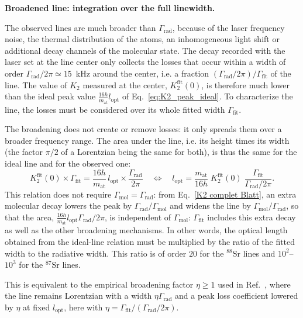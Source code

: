 \textbf{Broadened line: integration over the full linewidth.}

The observed lines are much broader than $\Gamma_{\text{rad}}$, because of the laser
frequency noise, the thermal distribution of the atoms, an inhomogeneous light shift
or additional decay channels of the molecular state. The
decay recorded with the laser set at the line center only collects the losses that
occur within a width of order $\Gamma_{\text{rad}}/2\pi\simeq15$~kHz around the
center, i.e. a fraction $(\Gamma_{\text{rad}}/2\pi)/\Gamma_{\text{fit}}$ of the line.
The value of $K_2$ measured at the center, $K_2^{\text{fit}}(0)$, is therefore much
lower than the ideal peak value $\frac{16h}{m_{\text{at}}}l_{\text{opt}}$ of
Eq.~\ref{eq:K2_peak_ideal}. To characterize the line, the losses must be considered
over its whole fitted width $\Gamma_{\text{fit}}$.

The broadening does not create or remove losses: it only spreads them over a broader
frequency range. The area under the line, i.e. its height times its width (the factor
$\pi/2$ of a Lorentzian being the same for both), is thus the same for the ideal line
and for the observed one:
\begin{equation}
    K_2^{\text{fit}}(0)\times\Gamma_{\text{fit}}
    = \frac{16h}{m_{\text{at}}}\,l_{\text{opt}}\times\frac{\Gamma_{\text{rad}}}{2\pi}
    \quad\Longleftrightarrow\quad
    l_{\text{opt}} = \frac{m_{\text{at}}}{16h}\;K_2^{\text{fit}}(0)\;
    \frac{\Gamma_{\text{fit}}}{\Gamma_{\text{rad}}/2\pi}.
    \label{eq:lopt_corrected}
\end{equation}
This relation does not require $\Gamma_{\text{mol}}=\Gamma_{\text{rad}}$: from Eq.~\ref{K2 complet Blatt}, an extra
molecular decay lowers the peak by $\Gamma_{\text{rad}}/\Gamma_{\text{mol}}$ and widens the line by
$\Gamma_{\text{mol}}/\Gamma_{\text{rad}}$, so that the area, $\frac{16h}{m_{\text{at}}}l_{\text{opt}}\Gamma_{\text{rad}}/2\pi$,
is independent of $\Gamma_{\text{mol}}$: $\Gamma_{\text{fit}}$ includes this extra decay as well as the other
broadening mechanisms.
In other words, the optical length obtained from the ideal-line relation must be
multiplied by the ratio of the fitted width to the radiative width. This ratio is of
order $20$ for the $^{88}\text{Sr}$ lines and $10^2$--$10^3$ for the
$^{87}\text{Sr}$ lines.

This is equivalent to the empirical broadening factor $\eta\geq1$ used in Ref.~\cite{reschovsky_narrow-line_2018}, where the line remains Lorentzian with a width $\eta\Gamma_{\text{rad}}$ and a peak loss coefficient lowered by $\eta$ at fixed $l_{\text{opt}}$, here with $\eta=\Gamma_{\text{fit}}/(\Gamma_{\text{rad}}/2\pi)$.


